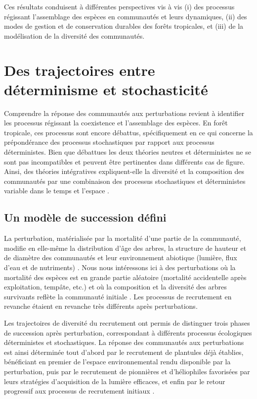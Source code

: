 \documentclass[
  11pt,
  french,
  A4paper,
  extrafontsizes,onecolumn,openright
  ]{memoir}
\begin{document}
Ces résultats conduisent à différentes perspectives vis à vis (i) des
processus régissant l'assemblage des espèces en communautés et leurs
dynamiques, (ii) des modes de gestion et de conservation durables des
forêts tropicales, et (iii) de la modélisation de la diversité des
communautés.

\section{Des trajectoires entre déterminisme et
stochasticité}\label{des-trajectoires-entre-determinisme-et-stochasticite}

Comprendre la réponse des communautés aux perturbations revient à
identifier les processus régissant la coexistence et l'assemblage des
espèces. En forêt tropicale, ces processus sont encore débattus,
spécifiquement en ce qui concerne la prépondérance des processus
stochastiques par rapport aux processus déterministes. Bien que
débattues les deux théories neutres et déterministes ne se sont pas
incompatibles et peuvent être pertinentes dans différents cas de figure.
Ainsi, des théories intégratives expliquent-elle la diversité et la
composition des communautés par une combinaison des processus
stochastiques et déterministes variable dans le temps et l'espace
\autocites{Gravel2006}{Chase2011}.

\subsection{Un modèle de succession
défini}\label{un-modele-de-succession-defini}

La perturbation, matérialisée par la mortalité d'une partie de la
communauté, modifie en elle-même la distribution d'âge des arbres, la
structure de hauteur et de diamètre des communautés et leur
environnement abiotique (lumière, flux d'eau et de nutriments)
\autocites{Gourlet-Fleury2000}{Putz2012}{Piponiot2016}{Rutishauser2016}.
Nous nous intéressons ici à des perturbations où la mortalité des
espèces est en grande partie aléatoire (mortalité accidentelle après
exploitation, tempâte, etc.) et où la composition et la diversité des
arbres survivants reflète la communauté initiale \autocite{Herault2018}.
Les processus de recrutement en revanche étaient en revanche très
différents après perturbations.

Les trajectoires de diversité du recrutement ont permis de distinguer
trois phases de succession après perturbation, correspondant à
différents processus écologiques déterministes et stochastiques. La
réponse des communautés aux perturbations est ainsi déterminée tout
d'abord par le recrutement de plantules déjà établies, bénéficiant en
premier de l'espace environnemental rendu disponible par la
perturbation, puis par le recrutement de pionnières et d'héliophiles
favorisées par leurs stratégies d'acquisition de la lumière efficaces,
et enfin par le retour progressif aux processus de recrutement initiaux
\autocites{Denslow2000}{Herault2010}.
\end{document}
